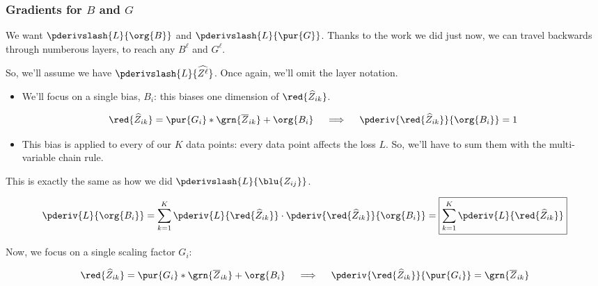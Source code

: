        \subsubsection{Gradients for $B$ and $G$}

            We want $\pderivslash{L}{\org{B}}$ and $\pderivslash{L}{\pur{G}}$. Thanks to the work we did just now, we can travel backwards through numberous layers, to reach any $B^\ell$ and $G^\ell$. 

            So, we'll assume we have $\pderivslash{L}{\widehat{Z^\ell}}$. Once again, we'll omit the layer notation.

            \begin{itemize}
                \item We'll focus on a single bias, $B_i$: this biases one dimension of $\red{\widehat{Z}_{ik}}$.

                \begin{equation}
                    \red{\widehat{Z}_{ik}} = \pur{G_i} * \grn{\overline{Z}_{ik}} + \org{B_i}
                    \quad \implies \quad
                    \pderiv{ \red{\widehat{Z}_{ik}} }{ \org{B_i} }  = 1
                \end{equation}
                
                \item This bias is applied to every of our $K$ data points: every data point affects the loss $L$. So, we'll have to sum them with the multi-variable chain rule.
            \end{itemize}

            This is exactly the same as how we did $\pderivslash{L}{\blu{Z_{ij}}}$.

            \begin{equation}
                \pderiv{L}{\org{B_i}} = 
                \sum_{k=1}^K 
                \pderiv{L}{ \red{\widehat{Z}_{ik}} } \cdot \pderiv{\red{\widehat{Z}_{ik}}}{\org{B_i}} =
                \boxed{
                \sum_{k=1}^K 
                \pderiv{L}{ \red{\widehat{Z}_{ik}} }
                }
            \end{equation}

            Now, we focus on a single scaling factor $G_i$: 

            \begin{equation}
                \red{\widehat{Z}_{ik}} = \pur{G_i} * \grn{\overline{Z}_{ik}} + \org{B_i}
                \quad \implies \quad
                \pderiv{ \red{\widehat{Z}_{ik}} }{ \pur{G_i}  }  = \grn{\overline{Z}_{ik}}
            \end{equation}

